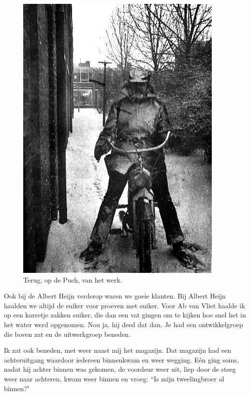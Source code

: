 \documentclass[12pt,twoside, openright]{memoir}
\begin{document}
\begin{figure}
\centering
\includegraphics[width=\textwidth]{img/242brommer}
\caption*{\footnotesize Terug, op de Puch, van het werk.}
\end{figure}

Ook bij de Albert Heijn verderop waren we goeie klanten. Bij Albert Heijn haalden we altijd de suiker voor proeven met suiker. Voor Ab van Vliet haalde ik op een karretje zakken suiker, die dan een vat gingen om te kijken hoe snel het in het water werd opgenomen. Nou ja, hij deed dat dan. Je had een ontwikkelgroep die boven zat en de uitwerkgroep beneden. 

Ik zat ook beneden, met weer naast mij het magazijn. Dat magazijn had een achteruitgang waardoor iedereen binnenkwam en weer wegging. Eén ging soms, nadat hij achter binnen was gekomen, de voordeur weer uit, liep door de steeg weer naar achteren, kwam weer binnen en vroeg: ``Is mijn tweelingbroer al binnen?"
\end{document}
